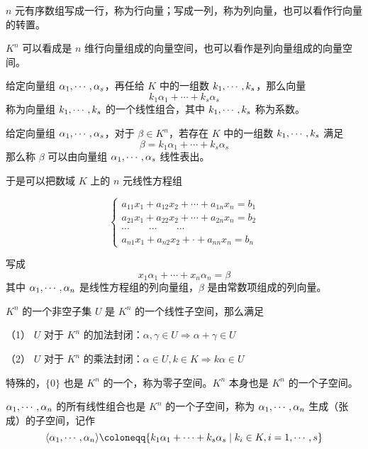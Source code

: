 $n$ 元有序数组写成一行，称为行向量；写成一列，称为列向量，也可以看作行向量的转置。

$K^n$ 可以看成是 $n$ 维行向量组成的向量空间，也可以看作是列向量组成的向量空间。

\begin{definition}[线性组合]
	给定向量组 $\alpha_1,\cdots,\alpha_s$，再任给 $K$ 中的一组数 $k_1,\cdots,k_s$，那么向量
	\[k_1 \alpha_1+\cdots+k_s \alpha_s\]
	称为向量组 $k_1,\cdots,k_s$ 的一个线性组合，其中 $k_1,\cdots,k_s$ 称为系数。
\end{definition}

\begin{definition}[线性表出]
	给定向量组 $\alpha_1,\cdots,\alpha_s$，对于 $\beta \in K^n$，若存在 $K$ 中的一组数 $k_1,\cdots,k_s$ 满足
	\[\beta = k_1\alpha_1+\cdots+k_s\alpha_s\]
	那么称 $\beta$ 可以由向量组 $\alpha_1,\cdots,\alpha_s$ 线性表出。
\end{definition}

于是可以把数域 $K$ 上的 $n$ 元线性方程组

\begin{equation*}
	\left\{
	\begin{matrix}
		a_{11}x_1+a_{12}x_2+\cdots+a_{1n}x_n=b_1 \\
		a_{21}x_1+a_{22}x_2+\cdots+a_{2n}x_n=b_2 \\
		\cdots\qquad\cdots\qquad\cdots           \\
		a_{n1}x_1+a_{n2}x_2+\cdot +a_{nn}x_n=b_n
	\end{matrix}
	\right.
\end{equation*}

写成
\[x_1\alpha_1+\cdots+x_n\alpha_n=\beta\]
其中 $\alpha_1,\cdots,\alpha_n$ 是线性方程组的列向量组，$\beta$ 是由常数项组成的列向量。

\begin{definition}[线性子空间]
	$K^n$ 的一个非空子集 $U$ 是 $K^n$ 的一个线性子空间，那么满足

	（1） $U$ 对于 $K^n$ 的加法封闭：$\alpha,\gamma\in U \Rightarrow \alpha+\gamma \in U$

	（2） $U$ 对于 $K^n$ 的乘法封闭：$\alpha \in U,k\in K \Rightarrow k\alpha \in U$
\end{definition}

特殊的，$\{0\}$ 也是 $K^n$ 的一个，称为零子空间。$K^n$ 本身也是 $K^n$ 的一个子空间。

$\alpha_1,\cdots,\alpha_n$ 的所有线性组合也是 $K^n$ 的一个子空间，称为 $\alpha_1,\cdots,\alpha_n$ 生成（张成）的子空间，记作
\[\langle \ji{\alpha}{n}\rangle\coloneqq \{k_1\alpha_1+\cdots+k_s\alpha_s \mid k_i\in K,i=1,\cdots,s\}\]

